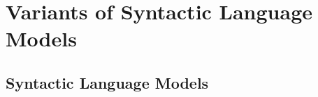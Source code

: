\documentclass[11pt]{article}
\begin{document}






\section{Variants of Syntactic Language Models}

\subsection{Syntactic Language Models}
\end{document}
